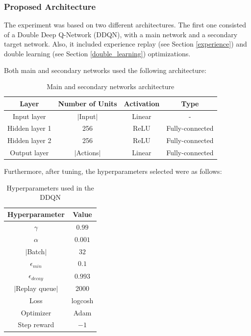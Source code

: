 \documentclass[11pt,twoside]{article}
\begin{document}
\subsubsection{Proposed Architecture}\label{arch}

The experiment was based on two different architectures. The first one consisted of a Double Deep Q-Network (DDQN), with a main network and a secondary target network. Also, it included experience replay (see Section \ref{experience}) and double learning (see Section \ref{double_learning}) optimizations.

Both main and secondary networks used the following architecture:

\begin{table}[H]
	\begin{center}
		\begin{tabular}{|c|c|c|c|} 
			\hline
			Layer & Number of Units & Activation & Type \\
			\hline\hline
			Input layer & $|$Input$|$ & Linear & - \\ 
			\hline
			Hidden layer 1 & 256 & ReLU & Fully-connected\\
			\hline
			Hidden layer 2 & 256 & ReLU & Fully-connected\\
			\hline
			Output layer & $|$Actions$|$ & Linear & Fully-connected\\
			\hline
		\end{tabular}
		\caption{Main and secondary networks architecture}
	\end{center}
\end{table}

Furthermore, after tuning, the hyperparameters selected were as follows:

\begin{table}[H]
	\begin{center}
		\begin{tabular}{|c |c|} 
			\hline
			Hyperparameter & Value \\
			\hline\hline
			$\gamma$ & $0.99$ \\
			$\alpha$ & $0.001$ \\
			$|$Batch$|$ & $32$ \\
			$\epsilon_{min}$ & $0.1$ \\
			$\epsilon_{decay}$ & $0.993$ \\
			$|$Replay queue$|$ & 2000 \\
			Loss & logcosh \\
			Optimizer & Adam \\
			Step reward & $-1$ \\
			\hline
		\end{tabular}
		\caption{Hyperparameters used in the DDQN}
	\end{center}
\end{table}
\end{document}
